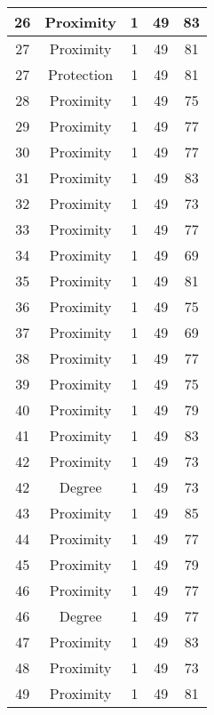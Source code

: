 \documentclass[results.tex]{subfiles}
\begin{document}
\begin{center}
\begin{tabular}{| c || c | c | c | c |}
    \hline
    26 & Proximity & 1 & 49 & 83 \\ 
    \hline
    27 & Proximity & 1 & 49 & 81 \\ 
    \hline
    27 & Protection & 1 & 49 & 81 \\ 
    \hline
    28 & Proximity & 1 & 49 & 75 \\ 
    \hline
    29 & Proximity & 1 & 49 & 77 \\ 
    \hline
    30 & Proximity & 1 & 49 & 77 \\ 
    \hline
    31 & Proximity & 1 & 49 & 83 \\ 
    \hline
    32 & Proximity & 1 & 49 & 73 \\ 
    \hline
    33 & Proximity & 1 & 49 & 77 \\ 
    \hline
    34 & Proximity & 1 & 49 & 69 \\ 
    \hline
    35 & Proximity & 1 & 49 & 81 \\ 
    \hline
    36 & Proximity & 1 & 49 & 75 \\ 
    \hline
    37 & Proximity & 1 & 49 & 69 \\ 
    \hline
    38 & Proximity & 1 & 49 & 77 \\ 
    \hline
    39 & Proximity & 1 & 49 & 75 \\ 
    \hline
    40 & Proximity & 1 & 49 & 79 \\ 
    \hline
    41 & Proximity & 1 & 49 & 83 \\ 
    \hline
    42 & Proximity & 1 & 49 & 73 \\ 
    \hline
    42 & Degree & 1 & 49 & 73 \\ 
    \hline
    43 & Proximity & 1 & 49 & 85 \\ 
    \hline
    44 & Proximity & 1 & 49 & 77 \\ 
    \hline
    45 & Proximity & 1 & 49 & 79 \\ 
    \hline
    46 & Proximity & 1 & 49 & 77 \\ 
    \hline
    46 & Degree & 1 & 49 & 77 \\ 
    \hline
    47 & Proximity & 1 & 49 & 83 \\ 
    \hline
    48 & Proximity & 1 & 49 & 73 \\ 
    \hline
    49 & Proximity & 1 & 49 & 81 \\ 
    \hline   \end{tabular}
\end{center}
\end{document}
